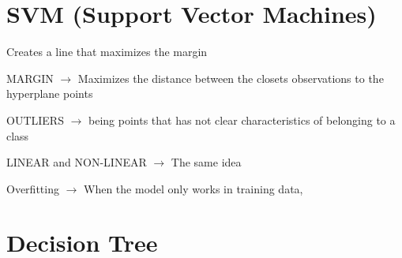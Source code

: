 \documentclass{article}
\newcommand{\ra}{ $\longrightarrow$ }
\begin{document}
\section{SVM (Support Vector Machines)}
Creates a line that maximizes the margin 

MARGIN \ra Maximizes the distance between the closets
observations to the hyperplane points

OUTLIERS \ra being points that has not clear characteristics
of belonging to a class

LINEAR and NON-LINEAR \ra The same idea

Overfitting \ra When the model only works in training data,

\section{Decision Tree}
\end{document}
